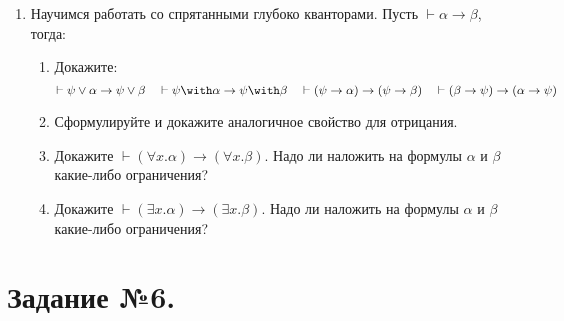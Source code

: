\documentclass[10pt,a4paper,oneside]{article}
\begin{document}
\begin{enumerate}

\item Научимся работать со спрятанными глубоко кванторами. Пусть $\vdash\alpha\rightarrow\beta$, тогда:
\begin{enumerate}
\item Докажите: $$\vdash\psi\vee\alpha \rightarrow \psi\vee\beta\quad\vdash\psi\with\alpha \rightarrow \psi\with\beta\quad
\vdash(\psi\rightarrow\alpha) \rightarrow (\psi\rightarrow\beta)\quad\vdash(\beta\rightarrow\psi) \rightarrow (\alpha\rightarrow\psi)$$
\item Сформулируйте и докажите аналогичное свойство для отрицания.
\item Докажите $\vdash(\forall x.\alpha)\rightarrow(\forall x.\beta)$. 
Надо ли наложить на формулы $\alpha$ и $\beta$ какие-либо ограничения?
\item Докажите $\vdash(\exists x.\alpha)\rightarrow(\exists x.\beta)$. 
Надо ли наложить на формулы $\alpha$ и $\beta$ какие-либо ограничения?
\end{enumerate}

\end{enumerate}

\section*{Задание №6.}
\end{document}
